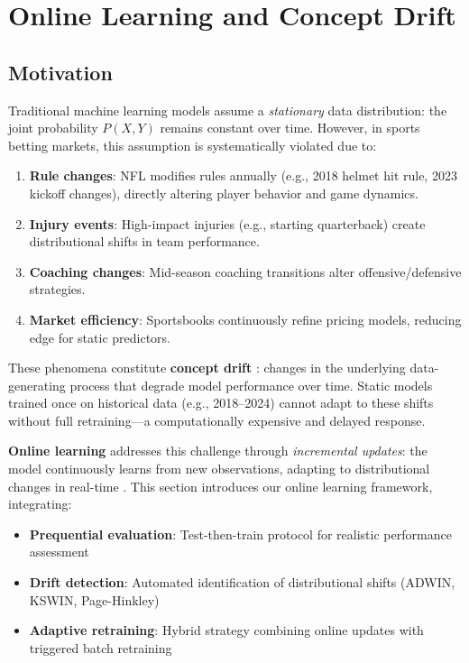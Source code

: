 \section{Online Learning and Concept Drift}
\label{sec:online-learning}

\subsection{Motivation}

Traditional machine learning models assume a \textit{stationary} data distribution: the joint probability $P(X, Y)$ remains constant over time. However, in sports betting markets, this assumption is systematically violated due to:

\begin{enumerate}
    \item \textbf{Rule changes}: NFL modifies rules annually (e.g., 2018 helmet hit rule, 2023 kickoff changes), directly altering player behavior and game dynamics.
    \item \textbf{Injury events}: High-impact injuries (e.g., starting quarterback) create distributional shifts in team performance.
    \item \textbf{Coaching changes}: Mid-season coaching transitions alter offensive/defensive strategies.
    \item \textbf{Market efficiency}: Sportsbooks continuously refine pricing models, reducing edge for static predictors.
\end{enumerate}

These phenomena constitute \textbf{concept drift} \citep{gama2014survey}: changes in the underlying data-generating process that degrade model performance over time. Static models trained once on historical data (e.g., 2018--2024) cannot adapt to these shifts without full retraining---a computationally expensive and delayed response.

\textbf{Online learning} addresses this challenge through \textit{incremental updates}: the model continuously learns from new observations, adapting to distributional changes in real-time \citep{bifet2018machine}. This section introduces our online learning framework, integrating:

\begin{itemize}
    \item \textbf{Prequential evaluation}: Test-then-train protocol for realistic performance assessment
    \item \textbf{Drift detection}: Automated identification of distributional shifts (ADWIN, KSWIN, Page-Hinkley)
    \item \textbf{Adaptive retraining}: Hybrid strategy combining online updates with triggered batch retraining
\end{itemize}

